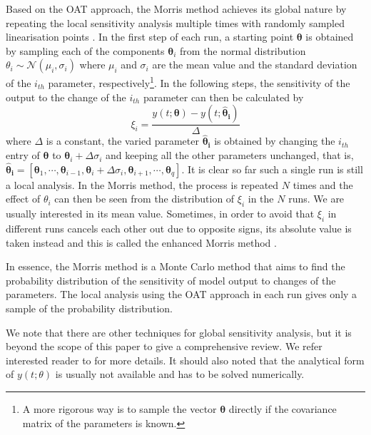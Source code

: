 \documentclass[letterpaper,twocolumn]{IEEEtran}
\begin{document}
Based on the OAT approach, the Morris method achieves its global nature by repeating the local sensitivity analysis multiple times with randomly sampled linearisation points \cite{morris1991factorial}. In the first step of each run, a starting point $\boldsymbol{\theta}$ is obtained by sampling each of the components $\boldsymbol{\theta}_i$ from the normal distribution $\theta_i \sim \mathcal{N}(\mu_i,\sigma_i)$ where $\mu_i$ and $\sigma_i$ are the mean value and the  standard deviation of the $i_{th}$ parameter, respectively\footnote{A more rigorous way is to sample the vector $\boldsymbol{\theta}$ directly if the covariance matrix of the parameters is known.}. In the following steps, the sensitivity of the output to the change of the $i_{th}$ parameter can then be calculated by
\begin{equation}\xi_i = \frac{y(t;\boldsymbol{\theta})-y(t;\boldsymbol{\hat{\theta}_i})}{\Delta}
\end{equation}
where $\Delta$ is a constant, the varied parameter $\boldsymbol{\hat{\theta}_i}$ is obtained by changing the $i_{th}$ entry of $\boldsymbol{\theta}$ to $\boldsymbol{\theta}_i+\Delta \sigma_i$ and keeping all the other parameters unchanged, that is, $\boldsymbol{\hat{\theta}_i} = [\boldsymbol{\theta}_1, \cdots,   \boldsymbol{\theta}_{i-1}, \boldsymbol{\theta}_i+\Delta \sigma_i, \boldsymbol{\theta}_{i+1},  \cdots, \boldsymbol{\theta}_q]$. It is clear so far such a single run is still a local analysis. In the Morris method, the process is repeated $N$ times and the effect of $\theta_i$ can then be seen from the distribution of $\xi_i$ in the $N$ runs. We are usually interested in its mean value. Sometimes, in order to avoid that $\xi_i$ in different runs cancels each other out due to opposite signs, its absolute value is taken instead and this is called the enhanced Morris method \cite{campolongo2005enhancing}.

In essence, the Morris method is a Monte Carlo method that aims to find the probability distribution of the sensitivity of model output to changes of the parameters. The local analysis using the OAT approach in each run gives only a sample of the probability distribution.

We note that there are other techniques for global sensitivity analysis, but it is beyond the scope of this paper to give a comprehensive review. We refer interested reader to \cite{saltelli2006sensitivity} for more details. It should also noted that the analytical form of $y(t;\theta)$ is usually not available and has to be solved numerically.
\end{document}
